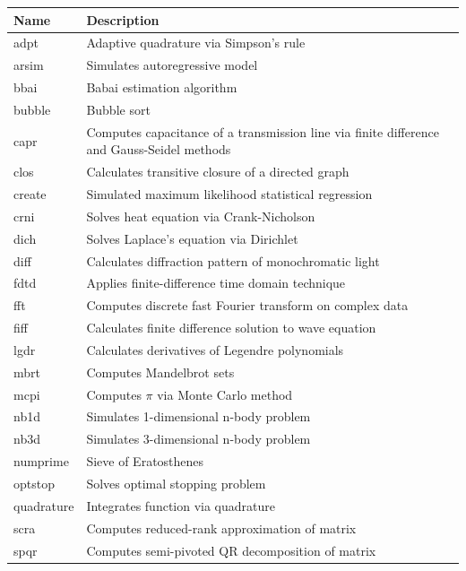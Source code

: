 \begin{table}
  \begin{tabular}{| l | p{10cm} |}
  \hline
  Name & Description \\ \hline
  adpt        & Adaptive quadrature via Simpson's rule \\ \hline
  arsim       & Simulates autoregressive model \\ \hline
  bbai        & Babai estimation algorithm \\ \hline
  bubble      & Bubble sort \\ \hline
  capr        & Computes capacitance of a transmission line via finite difference and Gauss-Seidel methods \\ \hline
  clos        & Calculates transitive closure of a directed graph \\ \hline
  create      & Simulated maximum likelihood statistical regression \\ \hline
  crni        & Solves heat equation via Crank-Nicholson \\ \hline
  dich        & Solves Laplace's equation via Dirichlet \\ \hline
  diff        & Calculates diffraction pattern of monochromatic light \\ \hline
  fdtd        & Applies finite-difference time domain technique \\ \hline
  fft         & Computes discrete fast Fourier transform on complex data \\ \hline
  fiff        & Calculates finite difference solution to wave equation \\ \hline
  lgdr        & Calculates derivatives of Legendre polynomials \\ \hline
  mbrt        & Computes Mandelbrot sets \\ \hline
  mcpi        & Computes $\pi$ via Monte Carlo method \\ \hline
  nb1d        & Simulates 1-dimensional n-body problem \\ \hline
  nb3d        & Simulates 3-dimensional n-body problem \\ \hline
  numprime    & Sieve of Eratosthenes \\ \hline
  optstop     & Solves optimal stopping problem \\ \hline
  quadrature  & Integrates function via quadrature \\ \hline
  scra        & Computes reduced-rank approximation of matrix \\ \hline
  spqr        & Computes semi-pivoted QR decomposition of matrix \\ \hline

\end{tabular}
\end{table}
